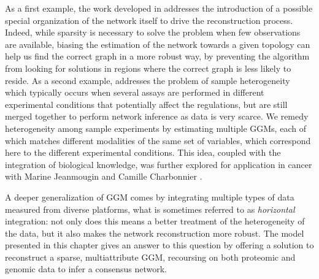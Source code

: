As a first example, the work developed in \cite{2009_EJS_Chiquet,
  2009_BI_Chiquet} addresses the introduction of a possible special
organization of the network itself to drive the reconstruction
process.  Indeed, while sparsity is necessary to solve the problem
when few observations are available, biasing the estimation of the
network towards a given topology can help us find the correct graph in
a more robust way, by preventing the algorithm from looking for
solutions in regions where the correct graph is less likely to
reside. As a second example, \cite{2011_SC_Chiquet} addresses the
problem of sample heterogeneity which typically occurs when several
assays are performed in different experimental conditions that
potentially affect the regulations, but are still merged together to
perform network inference as data is very scarce.  We remedy
heterogeneity among sample experiments by estimating multiple GGMs,
each of which matches different modalities of the same set of
variables, which correspond here to the different experimental
conditions. This idea, coupled with the integration of biological
knowledge, was further explored for application in cancer with Marine
Jeanmougin and Camille Charbonnier \cite{2014_inbook_jeanmougin}.

A deeper generalization of GGM comes by integrating multiple types of
data measured from diverse platforms, what is sometimes referred to as
\emph{horizontal} integration: not only does this means a better
treatment of the heterogeneity of the data, but it also makes the
network reconstruction more robust. The model presented in this
chapter gives an answer to this question by offering a solution to
reconstruct a sparse, multiattribute GGM, recoursing on both proteomic
and genomic data to infer a consensus network.
